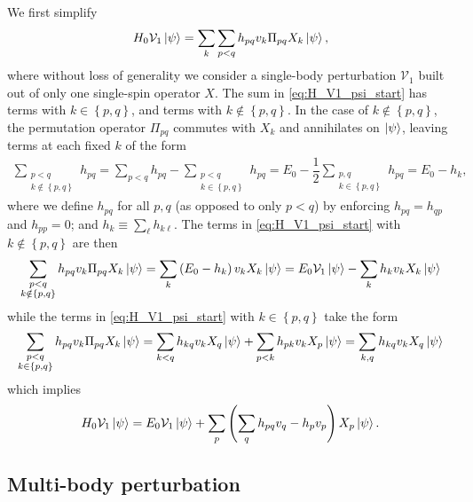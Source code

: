 \documentclass[nofootinbib,notitlepage,11pt]{revtex4-2}
\newcommand{\f}[2]{\dfrac{#1}{#2}} %
\newcommand{\p}[1]{\left(#1\right)} %
\renewcommand{\set}[1]{\left\{#1\right\}} %
\newcommand{\1}{\mathds{1}}
\newcommand{\V}{\mathcal{V}}
\begin{document}
We first simplify
\begin{align}
  H_0 \V_1 \ket\psi
  = \sum_k \sum_{p<q} h_{pq} v_k \Pi_{pq} X_k \ket\psi,
  \label{eq:H_V1_psi_start}
\end{align}
where without loss of generality we consider a single-body
perturbation $\V_1$ built out of only one single-spin operator $X$.
The sum in \eqref{eq:H_V1_psi_start} has terms with $k\in\set{p,q}$,
and terms with $k\notin\set{p,q}$.  In the case of $k\notin\set{p,q}$,
the permutation operator $\Pi_{pq}$ commutes with $X_k$ and
annihilates on $\ket\psi$, leaving terms at each fixed $k$ of the form
\begin{align}
  \sum_{\substack{p<q\\k\notin\set{p,q}}} h_{pq}
  = \sum_{p<q} h_{pq} - \sum_{\substack{p<q\\k\in\set{p,q}}} h_{pq}
  = E_0 - \f12 \sum_{\substack{p,q\\k\in\set{p,q}}} h_{pq}
  = E_0 - h_k,
\end{align}
where we define $h_{pq}$ for all $p,q$ (as opposed to only $p<q$) by
enforcing $h_{pq}=h_{qp}$ and $h_{pp}=0$; and
$h_k \equiv \sum_\ell h_{k\ell}$.  The terms in
\eqref{eq:H_V1_psi_start} with $k\notin\set{p,q}$ are then
\begin{align}
  \sum_{\substack{p<q\\k\notin\set{p,q}}}
  h_{pq} v_k \Pi_{pq} X_k \ket\psi
  = \sum_k \p{E_0 - h_k} v_k X_k \ket\psi
  = E_0 \V_1 \ket\psi - \sum_k h_k v_k X_k \ket\psi
\end{align}
while the terms in \eqref{eq:H_V1_psi_start} with $k\in\set{p,q}$ take
the form
\begin{align}
  \sum_{\substack{p<q\\k\in\set{p,q}}}
  h_{pq} v_k \Pi_{pq} X_k \ket\psi
  = \sum_{k<q} h_{kq} v_k X_q \ket\psi
  + \sum_{p<k} h_{pk} v_k X_p \ket\psi
  = \sum_{k,q} h_{kq} v_k X_q \ket\psi
\end{align}
which implies
\begin{align}
  H_0 \V_1 \ket\psi
  = E_0 \V_1 \ket\psi
  + \sum_p \p{\sum_{q} h_{pq} v_q - h_p v_p}
  X_p \ket\psi.
  \label{eq:H_V1_psi_end}
\end{align}

\subsection{Multi-body perturbation}
\label{sec:H_VM_psi}
\end{document}
